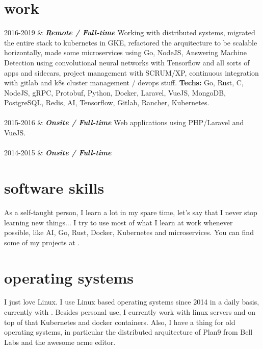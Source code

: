 \documentclass[]{cv-mauri}
\begin{document}
\section*{work}
\begin{tabularcv}
    2016-2019   &   
                    \textbf{\textit{Remote / Full-time}}
                    \newline
                    Working with distributed systems, migrated the entire stack to kubernetes in GKE, refactored the arquitecture to be scalable horizontally, made some microservices using Go, NodeJS, Answering Machine Detection using convolutional neural networks with Tensorflow and all sorts of apps and sidecars, project management with SCRUM/XP, continuous integration with gitlab and k8s cluster management / devops stuff.
                    \textbf{Techs:} Go, Rust, C, NodeJS, gRPC, Protobuf, Python, Docker, Laravel, VueJS, MongoDB, PostgreSQL, Redis, AI, Tensorflow, Gitlab, Rancher, Kubernetes.
                    \\[\vspacepar]
                    \\[\vspacepar]
    2015-2016   &   
				    \textbf{\textit{Onsite / Full-time}}
                    \newline
                    Web applications using PHP/Laravel and VueJS.
                    \\[\vspacepar]
                    \\[\vspacepar]
	2014-2015   &   
					\textbf{\textit{Onsite / Full-time}}
\end{tabularcv}

\section*{software skills}
    As a self-taught person, I learn a lot in my spare time, let's say that I never stop learning new things... I try to use most of what I learn at work whenever possible, like AI, Go, Rust, Docker, Kubernetes and microservices. You can find some of my projects at \href{https://mauri870.github.io}{\color{maincolor}{https://mauri870.github.io}}.

\section*{operating systems}
	I just love Linux. I use Linux based operating systems since 2014 in a daily basis, currently with \href{https://github.com/mauri870/dot-files}{\color{maincolor}{Arch linux and i3wm }}. Besides personal use, I currently work with linux servers and on top of that Kubernetes and docker containers. Also, I have a thing for old operating systems, in particular the distributed arquitecture of Plan9 from Bell Labs and the awesome acme editor.
\end{document}
